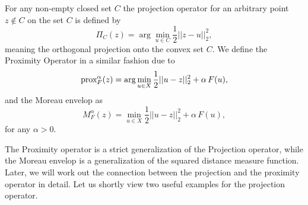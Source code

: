     \begin{definition} %
    \label{def:projection_operator}

        For any non-empty closed set $C$ the projection operator for an arbitrary point $z \notin C$ on the set $C$ is defined by
            \begin{equation}
                \Pi_{C}(z) = \arg \min_{u \in C} \frac{1}{2} ||z - u||_{2}^{2},
                \label{eq:projection_operator}
            \end{equation}
        meaning the orthogonal projection onto the convex set $C$. We define the Proximity Operator in a similar fashion due to
            \begin{equation}
                \textnormal{prox}^{\alpha}_{F}(z) = \arg \min_{u \in X} \frac{1}{2} ||u - z||_{2}^{2} + \alpha \, F(u),
                \label{eq:proximity_operator}
            \end{equation}
        and the Moreau envelop as
            \begin{equation}
                M^{\alpha}_{F}(z) = \min_{u \in X} \frac{1}{2} ||u - z||_{2}^{2} + \alpha \, F(u),
                \label{eq:envelop_operator}
            \end{equation}
        for any $\alpha > 0$.
    \end{definition}

    The Proximity operator is a strict generalization of the Projection operator, while the Moreau envelop is a generalization of the squared distance measure function. Later, we will work out the connection between the projection and the proximity operator in detail. Let us shortly view two useful examples for the projection operator.

